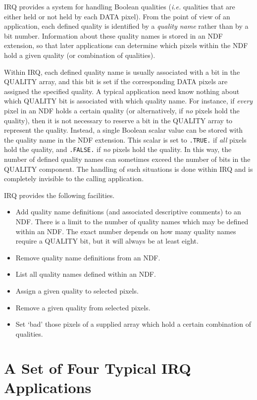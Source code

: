 \documentclass[twoside,11pt,nolof]{starlink}
\begin{document}
IRQ provides a system for handling Boolean qualities (\emph{i.e.}
qualities that are either held or not held by each DATA pixel).  From the
point of view of an application, each defined quality is identified by a
\emph{quality name} rather than by a bit number. Information about these
quality names is stored in an NDF extension, so that later applications
can determine which pixels within the NDF hold a given quality (or
combination of qualities).

Within IRQ, each defined quality name is usually associated with a bit in
the QUALITY array, and this bit is set if the corresponding DATA pixels
are assigned the specified quality. A typical application need know
nothing about which QUALITY bit is associated with which quality name.
For instance, if \emph{every} pixel in an NDF holds a certain quality (or
alternatively, if \emph{no} pixels hold the quality), then it is not
necessary to reserve a bit in the QUALITY array to represent the quality.
Instead, a single Boolean scalar value can be stored with the quality
name in the NDF extension. This scalar is set to \texttt{.TRUE.} if \emph{all} pixels hold the quality, and \texttt{.FALSE.} if \emph{no} pixels hold
the quality. In this way, the number of defined quality names can
sometimes exceed the number of bits in the QUALITY component. The
handling of such situations is done within IRQ and is completely
invisible to the calling application.

IRQ provides the following facilities.
\begin{itemize}
\item Add quality name definitions (and associated descriptive comments)
to an NDF. There is a limit to the number of quality names which may be
defined within an NDF. The exact number depends on how many quality names
require a QUALITY bit, but it will always be at least eight.
\item Remove quality name definitions from an NDF.
\item List all quality names defined within an NDF.
\item Assign a given quality to selected pixels.
\item Remove a given quality from selected pixels.
\item Set `bad' those pixels of a supplied array which hold a certain
combination of qualities.
\end{itemize}

\section {A Set of Four Typical IRQ Applications}
\end{document}
